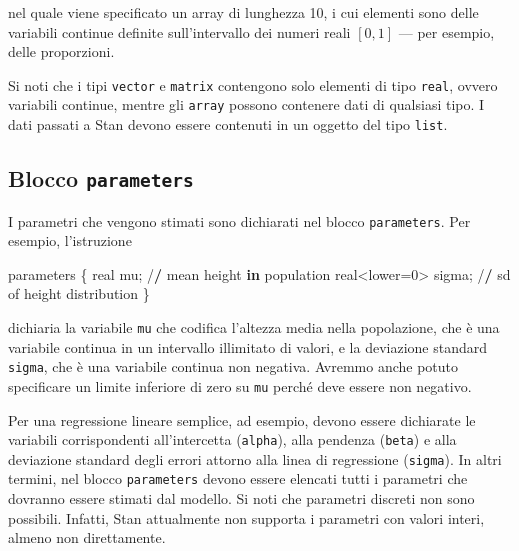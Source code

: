 \documentclass[
  11pt,
]{krantz}
\makeatletter
\newenvironment{Shaded}{\begin{snugshade}}{\end{snugshade}}
\newcommand{\ControlFlowTok}[1]{\textcolor[rgb]{0.27,0.27,0.27}{\textbf{#1}}}
\newcommand{\DecValTok}[1]{\textcolor[rgb]{0.06,0.06,0.06}{#1}}
\newcommand{\ErrorTok}[1]{\textcolor[rgb]{0.14,0.14,0.14}{\textbf{#1}}}
\newcommand{\NormalTok}[1]{#1}
\newcommand{\OtherTok}[1]{\textcolor[rgb]{0.37,0.37,0.37}{#1}}
\newcommand{\SpecialCharTok}[1]{\textcolor[rgb]{0,0,0}{#1}}
\newenvironment{kframe}{%
\medskip{}
\setlength{\fboxsep}{.8em}
 \def\at@end@of@kframe{}%
 \ifinner\ifhmode%
  \def\at@end@of@kframe{\end{minipage}}%
  \begin{minipage}{\columnwidth}%
 \fi\fi%
 \def\FrameCommand##1{\hskip\@totalleftmargin \hskip-\fboxsep
 \colorbox{shadecolor}{##1}\hskip-\fboxsep
     \hskip-\linewidth \hskip-\@totalleftmargin \hskip\columnwidth}%
 \MakeFramed {\advance\hsize-\width
   \@totalleftmargin\z@ \linewidth\hsize
   \@setminipage}}%
 {\par\unskip\endMakeFramed%
 \at@end@of@kframe}
\renewenvironment{Shaded}{\begin{kframe}}{\end{kframe}}
\theoremstyle{definition}
\theoremstyle{definition}
\theoremstyle{definition}
\theoremstyle{definition}
\theoremstyle{remark}
\makeatother
\begin{document}
nel quale viene specificato un array di lunghezza 10, i cui elementi sono delle variabili continue definite sull'intervallo dei numeri reali \([0, 1]\) --- per esempio, delle proporzioni.

Si noti che i tipi \texttt{vector} e \texttt{matrix} contengono solo elementi di tipo \texttt{real}, ovvero variabili continue, mentre gli \texttt{array} possono contenere dati di qualsiasi tipo. I dati passati a Stan devono essere contenuti in un oggetto del tipo \texttt{list}.

\hypertarget{blocco-parameters}{%
\subsection{\texorpdfstring{Blocco \texttt{parameters}}{Blocco parameters}}\label{blocco-parameters}}

I parametri che vengono stimati sono dichiarati nel blocco \texttt{parameters}. Per esempio, l'istruzione

\begin{Shaded}
\begin{Highlighting}[]
\NormalTok{parameters \{}
\NormalTok{  real mu; }\SpecialCharTok{/}\ErrorTok{/}\NormalTok{ mean height }\ControlFlowTok{in}\NormalTok{ population}
\NormalTok{  real}\SpecialCharTok{\textless{}}\NormalTok{lower}\OtherTok{=}\DecValTok{0}\SpecialCharTok{\textgreater{}}\NormalTok{ sigma; }\SpecialCharTok{/}\ErrorTok{/}\NormalTok{ sd of height distribution}
\NormalTok{\}}
\end{Highlighting}
\end{Shaded}

dichiaria la variabile \texttt{mu} che codifica l'altezza media nella popolazione, che è una variabile continua in un intervallo illimitato di valori, e la deviazione standard \texttt{sigma}, che è una variabile continua non negativa. Avremmo anche potuto specificare un limite inferiore di zero su \texttt{mu} perché deve essere non negativo.

Per una regressione lineare semplice, ad esempio, devono essere dichiarate le variabili corrispondenti all'intercetta (\texttt{alpha}), alla pendenza (\texttt{beta}) e alla deviazione standard degli errori attorno alla linea di regressione (\texttt{sigma}). In altri termini, nel blocco \texttt{parameters} devono essere elencati tutti i parametri che dovranno essere stimati dal modello. Si noti che parametri discreti non sono possibili. Infatti, Stan attualmente non supporta i parametri con valori interi, almeno non direttamente.
\end{document}
